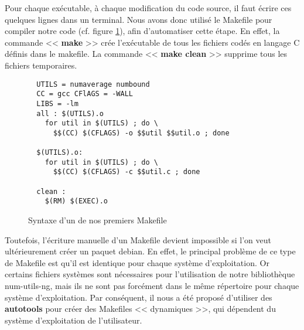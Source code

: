 Pour chaque ex\'ecutable, \`a chaque modification du code source, il faut \'ecrire ces quelques lignes dans un terminal.
Nous avons donc utilis\'e le Makefile pour compiler notre code (cf. figure \ref{fig:exemple_makefile}), afin d'automatiser cette \'etape.
En effet, la commande << \textbf{make} >> cr\'ee l'ex\'ecutable de tous les fichiers cod\'es en langage C d\'efinis dans le makefile. La commande
<< \textbf{make clean} >> supprime tous les fichiers temporaires.
\newline
\begin{figure}[h] 
\begin{center}
\begin{minipage}[|c|]{0.7\linewidth}
\begin{verbatim}
  UTILS = numaverage numbound
  CC = gcc CFlAGS = -WALL
  LIBS = -lm
  all : $(UTILS).o
    for util in $(UTILS) ; do \
      $$(CC) $(CFLAGS) -o $$util $$util.o ; done

  $(UTILS).o:
    for util in $(UTILS) ; do \
      $$(CC) $(CFLAGS) -c $$util.c ; done

  clean :
    $(RM) $(EXEC).o
\end{verbatim}
\end{minipage}
\end{center}
\caption{Syntaxe d'un de nos premiers Makefile}
\label{fig:exemple_makefile}
\end{figure}

Toutefois, l'\'ecriture manuelle d'un Makefile devient impossible si l'on veut ult\'erieurement cr\'eer un paquet debian.
En effet, le principal probl\`eme de ce type de Makefile est qu'il est identique pour chaque syst\`eme d'exploitation. Or certains fichiers
syst\`emes sont n\'ecessaires pour l'utilisation de notre biblioth\`eque num-utils-ng, mais ils ne sont pas forc\'ement dans le m\^eme r\'epertoire pour
chaque syst\`eme d'exploitation.
\newline 	
Par cons\'equent, il nous a \'et\'e propos\'e d'utiliser des \textbf{autotools} pour cr\'eer des Makefiles << dynamiques >>, qui d\'ependent du syst\`eme
d'exploitation de l'utilisateur.

